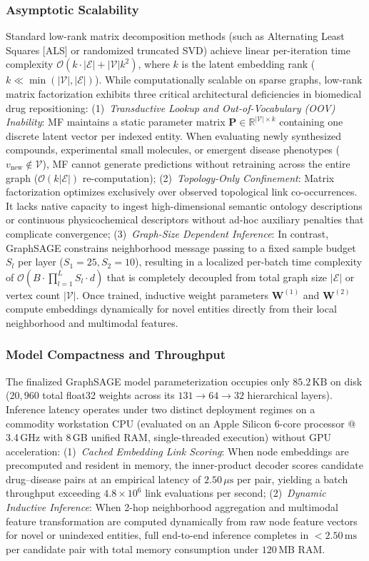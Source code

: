 \documentclass[preprint,12pt]{elsarticle}
\begin{document}
\subsubsection{Asymptotic Scalability}
Standard low-rank matrix decomposition methods (such as Alternating Least Squares [ALS] or randomized truncated SVD) achieve linear per-iteration time complexity $\mathcal{O}(k \cdot |\mathcal{E}| + |\mathcal{V}| k^2)$, where $k$ is the latent embedding rank ($k \ll \min(|\mathcal{V}|, |\mathcal{E}|)$). While computationally scalable on sparse graphs, low-rank matrix factorization exhibits three critical architectural deficiencies in biomedical drug repositioning:
(1)~\textit{Transductive Lookup and Out-of-Vocabulary (OOV) Inability}: MF maintains a static parameter matrix $\mathbf{P} \in \mathbb{R}^{|\mathcal{V}| \times k}$ containing one discrete latent vector per indexed entity. When evaluating newly synthesized compounds, experimental small molecules, or emergent disease phenotypes ($v_{\text{new}} \notin \mathcal{V}$), MF cannot generate predictions without retraining across the entire graph ($\mathcal{O}(k |\mathcal{E}|)$ re-computation);
(2)~\textit{Topology-Only Confinement}: Matrix factorization optimizes exclusively over observed topological link co-occurrences. It lacks native capacity to ingest high-dimensional semantic ontology descriptions or continuous physicochemical descriptors without ad-hoc auxiliary penalties that complicate convergence;
(3)~\textit{Graph-Size Dependent Inference}: In contrast, GraphSAGE constrains neighborhood message passing to a fixed sample budget $S_l$ per layer ($S_1=25, S_2=10$), resulting in a localized per-batch time complexity of $\mathcal{O}(B \cdot \prod_{l=1}^L S_l \cdot d)$ that is completely decoupled from total graph size $|\mathcal{E}|$ or vertex count $|\mathcal{V}|$. Once trained, inductive weight parameters $\mathbf{W}^{(1)}$ and $\mathbf{W}^{(2)}$ compute embeddings dynamically for novel entities directly from their local neighborhood and multimodal features.

\subsubsection{Model Compactness and Throughput}
The finalized GraphSAGE model parameterization occupies only $85.2\,\mathrm{KB}$ on disk ($20,960$ total float32 weights across its $131 \to 64 \to 32$ hierarchical layers). Inference latency operates under two distinct deployment regimes on a commodity workstation CPU (evaluated on an Apple Silicon 6-core processor @ 3.4\,GHz with 8\,GB unified RAM, single-threaded execution) without GPU acceleration:
(1)~\textit{Cached Embedding Link Scoring}: When node embeddings are precomputed and resident in memory, the inner-product decoder scores candidate drug--disease pairs at an empirical latency of $2.50\,\mu\mathrm{s}$ per pair, yielding a batch throughput exceeding $4.8 \times 10^6$ link evaluations per second;
(2)~\textit{Dynamic Inductive Inference}: When 2-hop neighborhood aggregation and multimodal feature transformation are computed dynamically from raw node feature vectors for novel or unindexed entities, full end-to-end inference completes in $<2.50\,\mathrm{ms}$ per candidate pair with total memory consumption under $120\,\mathrm{MB}$ RAM.
\end{document}
